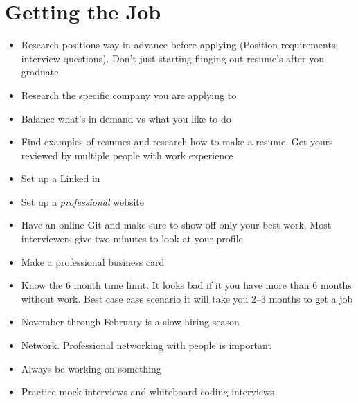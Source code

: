 \documentclass[12pt]{article}
\begin{document}
\section{Getting the Job}
\begin{itemize}
\item Research positions way in advance before applying (Position requirements, interview questions).  Don't just starting flinging out resume's after you graduate.
\item Research the specific company you are applying to
\item Balance what's in demand vs what you like to do
\item Find examples of resumes and research how to make a resume.  Get yours reviewed by multiple people with work experience
\item Set up a Linked in
\item Set up a \textit{professional} website
\item Have an online Git and make sure to show off only your best work.  Most interviewers give two minutes to look at your profile
\item Make a professional business card
\item Know the 6 month time limit.  It looks bad if it you have more than 6 months without work.  Best case case scenario it will take you 2--3 months to get a job
\item November through February is a slow hiring season
\item Network.  Professional networking with people is important
\item Always be working on something
\item Practice mock interviews and whiteboard coding interviews
\end{itemize}
\end{document}

